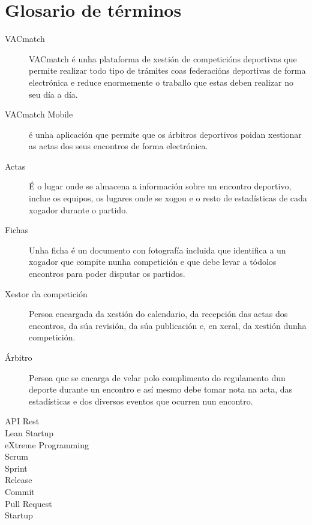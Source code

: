 \chapter{Glosario de términos}
\label{chap:glosario-terminos}


\begin{description}
  \item [VACmatch] VACmatch é unha plataforma de xestión de competicións deportivas que 
permite realizar todo tipo de trámites coas federacións deportivas de forma electrónica e 
reduce enormemente o traballo que estas deben realizar no seu día a día.
  \item [VACmatch Mobile] é unha aplicación que permite que os árbitros deportivos 
poidan xestionar as actas dos seus encontros de forma electrónica.
  \item [Actas] É o lugar onde se almacena a información sobre un encontro 
deportivo, inclue os equipos, os lugares onde se xogou e o resto de estadísticas de cada 
xogador durante o partido.
  \item [Fichas] Unha ficha é un documento con fotografía incluida que identifica a un 
xogador que compite nunha competición e que debe levar a tódolos encontros para poder 
disputar os partidos.
  \item [Xestor da competición] Persoa encargada da xestión do calendario, da recepción 
das actas dos encontros, da súa revisión, da súa publicación e, en xeral, da xestión dunha 
competición.
  \item [Árbitro] Persoa que se encarga de velar polo complimento do regulamento dun 
deporte durante un encontro e así mesmo debe tomar nota na acta, das estadísticas e dos 
diversos eventos que ocurren nun encontro.
 \item [API Rest]
 \item [Lean Startup]
 \item [eXtreme Programming]
 \item [Scrum]
 \item [Sprint]
 \item [Release]
 \item [Commit]
 \item [Pull Request]
 \item [Startup]
\end{description}
